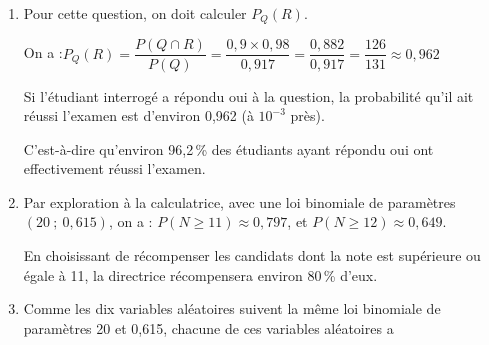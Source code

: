 \documentclass[10pt]{article}
\begin{document}
\begin{enumerate}
\begin{enumerate}
		\item On sait que $P(Q)=0,917$, or, comme $R$ et $\overline{R}$ partitionnent l'univers, en vertu de la loi des probabilités totales, on a également :

		$\begin{aligned} P(Q) &= P\big(Q \cap R\big) + P\left(Q \cap \overline{R}\right)\\
		&= x\times 0,98 + (1 -x) \times 0,35\\
		&= 0,98x + 0,35 - 0,35x\\
		&= 0,63x + 0,35		\end{aligned}$

		Puisque la probabilité de $Q$ est unique, on peut donc écrire, puis résoudre l'équation :
		\quad
		$\begin{aligned}[t] 0,63x + 0,35 = 0,917 &\iff 0,63x = 0,567\\
		&\iff x = \dfrac{0,567}{0,63}\\
		&\iff x = 0,9\end{aligned}$

La solution de l'équation est donc 0,9 : la probabilité que l'étudiant ait réussi son examen est donc de 0,9 (ou bien : 90\,\% des étudiants ont réussi leur examen).
	\end{enumerate}

	\item Pour cette question, on doit calculer $P_Q(R)$.

	On a :\quad $P_Q(R) = \dfrac{P(Q \cap R)}{P(Q)} = \dfrac{0,9 \times 0,98}{0,917}=\dfrac{0,882}{0,917}=\dfrac{126}{131}\approx0,962$

Si l'étudiant interrogé a répondu \og oui\fg{}  à la question, la probabilité qu'il ait réussi l'examen est d'environ 0,962 (à $10^{-3}$ près).

C'est-à-dire qu'environ 96,2\,\% des étudiants ayant répondu \og oui\fg{} ont effectivement réussi l'examen.

	\item Par exploration à la calculatrice, avec une loi binomiale de paramètres $(20~;~0,615)$, on a :\quad
	$P(N\geqslant 11)\approx 0,797$, \quad et \quad $P(N \geqslant 12) \approx 0,649$.

En choisissant de récompenser les candidats dont la note est supérieure ou égale à 11, la directrice récompensera environ 80\,\% d'eux.

	\item Comme les dix variables aléatoires suivent la même loi binomiale de paramètres 20 et 0,615, chacune de ces variables aléatoires a


\end{enumerate}
\end{document}

